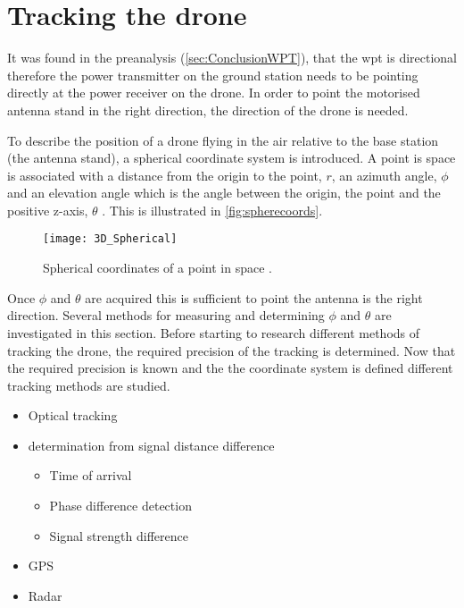 \graphicspath{{figures/tracking/}}

\section{Tracking the drone} \label{sec:TrackingTheDrone}
It was found in the preanalysis (\autoref{sec:ConclusionWPT}), that the \gls{wpt} is directional therefore the power transmitter on the ground station needs to be pointing directly at the power receiver on the drone. In order to point the motorised antenna stand in the right direction, the direction of the drone is needed. 

To describe the position of a drone flying in the air relative to the base station (the antenna stand), a spherical coordinate system is introduced. A point is space is associated with a distance from the origin to the point, $r$, an azimuth angle, $\phi$ and an elevation angle which is the angle between the origin, the point and the positive z-axis, $\theta$ \citep{book:calculus}. This is illustrated in \autoref{fig:spherecoords}.
\begin{figure} [h!]
\centering
\texttt{[image: 3D\_Spherical]}
\caption{Spherical coordinates of a point in space \citep{website:spherecoords}.}
\label{fig:spherecoords}
\end{figure}

Once $\phi$ and $\theta$ are acquired this is sufficient to point the antenna is the right direction.
Several methods for measuring and determining $\phi$ and $\theta$ are investigated in this section. 
Before starting to research different methods of tracking the drone, the required precision of the tracking is determined. Now that the required precision is known and the the coordinate system is defined different tracking methods are studied.
\begin{itemize}
\item Optical tracking
\item {} determination from signal distance difference
\begin{itemize}
\item Time of arrival 
\item Phase difference detection 
\item Signal strength difference
\end{itemize}
\item GPS 
\item Radar
\end{itemize}







